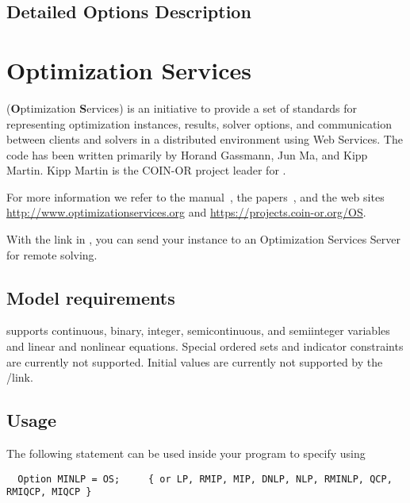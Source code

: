 \subsection{Detailed Options Description}
\label{sub:ipoptoptions}




\section{Optimization Services}

\OS (\textbf{O}ptimization \textbf{S}ervices) is an initiative to provide a set of standards for representing optimization instances, results, solver options, and communication between clients and solvers in a distributed environment using Web Services.
The code has been written primarily by Horand Gassmann, Jun Ma, and Kipp Martin.
Kipp Martin is the COIN-OR project leader for \OS.

For more information we refer to the \OS manual~\cite{Ma2005}, the papers~\cite{FourerMaMartin2009,FourerMaMartin2010,OSManual}, and the web sites \url{http://www.optimizationservices.org} and \url{https://projects.coin-or.org/OS}.

With the \OS link in \GAMS, you can send your instance to an Optimization Services Server for remote solving.

\subsection{Model requirements}

\OS supports continuous, binary, integer, semicontinuous, and semiinteger variables and linear and nonlinear equations.
Special ordered sets and indicator constraints are currently not supported.
Initial values are currently not supported by the \GAMS/\OS link.

\subsection{Usage}

The following statement can be used inside your \GAMS program to specify using \OS
\begin{verbatim}
  Option MINLP = OS;     { or LP, RMIP, MIP, DNLP, NLP, RMINLP, QCP, RMIQCP, MIQCP }
\end{verbatim}

